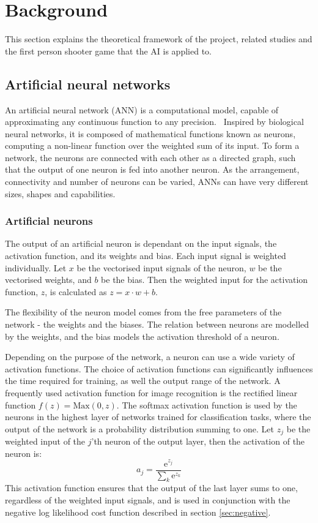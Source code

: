 
\section{Background}
\label{sec:background}
This section explains the theoretical framework of the project, related studies and the first person shooter game that the AI is applied to.

\subsection{Artificial neural networks}
An artificial neural network (ANN) is a computational model, capable of approximating any continuous function to any precision.~\cite{kurt} Inspired by biological neural networks, it is composed of mathematical functions known as neurons, computing a non-linear function over the weighted sum of its input. To form a network, the neurons are connected with each other as a directed graph, such that the output of one neuron is fed into another neuron. As the arrangement, connectivity and number of neurons can be varied, ANNs can have very different sizes, shapes and capabilities.

\subsubsection{Artificial neurons}
The output of an artificial neuron is dependant on the input signals, the activation function, and its weights and bias. Each input signal is weighted individually. Let $x$ be the vectorised input signals of the neuron, $w$ be the vectorised weights, and $b$ be the bias. Then the weighted input for the activation function, $z$, is calculated as $z = x \cdot w + b$.

The flexibility of the neuron model comes from the free parameters of the network - the weights and the biases. The relation between neurons are modelled by the weights, and the bias models the activation threshold of a neuron.

Depending on the purpose of the network, a neuron can use a wide variety of activation functions. The choice of activation functions can significantly influences the time required for training, as well the output range of the network. A frequently used activation function for image recognition is the rectified linear function $f(z) = \text{Max}(0,z)$. The softmax activation function is used by the neurons in the highest layer of networks trained for classification tasks, where the output of the network is a probability distribution summing to one. Let $z_j$ be the weighted input of the $j$'th neuron of the output layer, then the activation of the neuron is:
$$a_j = \frac{ \text{e}^{z_j} }{ \sum_{k} \text{e}^{z_k} }$$
This activation function ensures that the output of the last layer sums to one, regardless of the weighted input signals, and is used in conjunction with the negative log likelihood cost function described in section \ref{sec:negative}.

